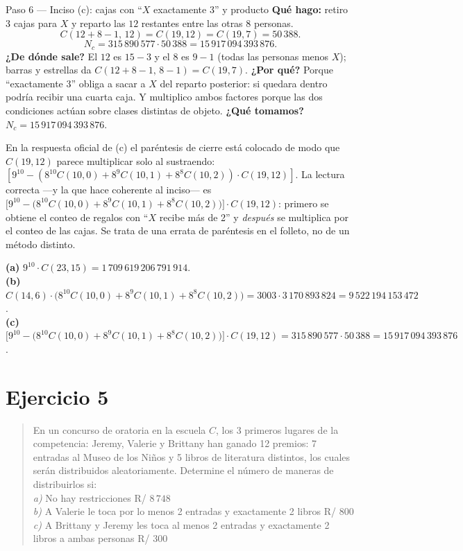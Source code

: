 \documentclass[11pt]{article}
\begin{document}
\begin{paso}{Paso 6 --- Inciso (c): cajas con ``$X$ exactamente 3'' y producto}
\textbf{Qué hago:} retiro 3 cajas para $X$ y reparto las $12$ restantes entre las otras $8$ personas.
\[
C(12+8-1,\,12)=C(19,12)=C(19,7)=50\,388 .
\]
\[
N_c=315\,890\,577\cdot 50\,388=15\,917\,094\,393\,876 .
\]
\textbf{¿De dónde sale?} El $12$ es $15-3$ y el $8$ es $9-1$ (todas las personas menos $X$); barras y estrellas da $C(12+8-1,\,8-1)=C(19,7)$.
\textbf{¿Por qué?} Porque ``exactamente 3'' obliga a sacar a $X$ del reparto posterior: si quedara dentro podría recibir una cuarta caja. Y multiplico ambos factores porque las dos condiciones actúan sobre clases distintas de objeto.
\textbf{¿Qué tomamos?} $N_c=15\,917\,094\,393\,876$.
\end{paso}

\begin{nota}
En la respuesta oficial de (c) el paréntesis de cierre está colocado de modo que $C(19,12)$ parece multiplicar solo al sustraendo:
$[9^{10}-(8^{10}C(10,0)+8^9C(10,1)+8^8C(10,2))\cdot C(19,12)]$. La lectura correcta —y la que hace coherente al inciso— es
$\bigl[9^{10}-\bigl(8^{10}C(10,0)+8^9C(10,1)+8^8C(10,2)\bigr)\bigr]\cdot C(19,12)$: primero se obtiene el conteo de regalos con ``$X$ recibe más de 2'' y \emph{después} se multiplica por el conteo de las cajas. Se trata de una errata de paréntesis en el folleto, no de un método distinto.
\end{nota}

\begin{resp}
\textbf{(a)} $9^{10}\cdot C(23,15)=1\,709\,619\,206\,791\,914$.\\
\textbf{(b)} $C(14,6)\cdot\bigl(8^{10}C(10,0)+8^9C(10,1)+8^8C(10,2)\bigr)=3003\cdot 3\,170\,893\,824=9\,522\,194\,153\,472$.\\
\textbf{(c)} $\bigl[9^{10}-\bigl(8^{10}C(10,0)+8^9C(10,1)+8^8C(10,2)\bigr)\bigr]\cdot C(19,12)=315\,890\,577\cdot 50\,388=15\,917\,094\,393\,876$.
\end{resp}

\section*{Ejercicio 5}

\begin{quote}
En un concurso de oratoria en la escuela $C$, los 3 primeros lugares de la competencia: Jeremy, Valerie y Brittany han ganado 12 premios: 7 entradas al Museo de los Niños y 5 libros de literatura distintos, los cuales serán distribuidos aleatoriamente. Determine el número de maneras de distribuirlos si:\\
\textit{a)} No hay restricciones \hfill R/ $8\,748$\\
\textit{b)} A Valerie le toca por lo menos 2 entradas y exactamente 2 libros \hfill R/ $800$\\
\textit{c)} A Brittany y Jeremy les toca al menos 2 entradas y exactamente 2 libros a ambas personas \hfill R/ $300$
\end{quote}
\end{document}
